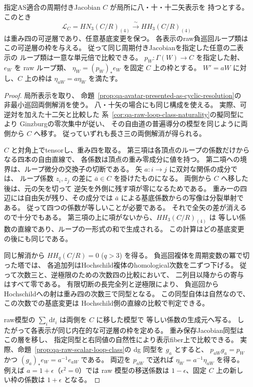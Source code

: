 \begin{proposition}[固定Jacobianの重み四の負巡回直線]
\label{prop:qa-jacobian-weight-four-cy-line}
指定AS適合の周期付きJacobian $C$ が局所に八・十・十二矢表示を
持つとする。このとき
\[
 \mathscr L_C=HN_3(C/R)_{(4)}
       \xrightarrow{\ \sim\ } HH_3(C/R)_{(4)}
\]
は重み四の可逆層であり、任意基底変更を保つ。
各表示のraw負巡回ループ類はこの可逆層の枠を与える。
従って同じ周期付きJacobianを指定した任意の二表示の
ループ類は一意な単元倍で比較できる。
$p_W:\Gamma(W)\to C$ を指定した射、$e_W$ を raw ループ類、
$\eta_W=(p_W)_*e_W$ を固定 $C$ 上の枠とする。
$W'=aW$ に対し、$C$ 上の枠は $\eta_{aW}=a\eta_W$ を満たす。
\end{proposition}
\begin{proof}
局所表示を取り、
命題~\ref{prop:qa-avatar-presented-as-cyclic-resolution}の
非最小巡回両側解消を使う。
八・十矢の場合にも同じ構成を使える。
実際、可逆対を加えた十二矢と比較した
系~\ref{cor:qa-raw-loop-class-naturality}の擬同型により
Ginzburgの零次集中が従い、
その自由道の普遍導分の模型を同じように両側から $C$ へ移す。
従っていずれも長さ三の両側解消が得られる。

$C$ と対角上でtensorし、重み四を取る。
第三項は各頂点のループの係数だけからなる四本の自由直線で、
各係数は頂点の重み零成分に値を持つ。
第二項への境界は、ループ微分の交換子の切断である。
矢 $a:i\to j$ に双対な関係の成分では、
ループ係数 $z_i,z_j$ の差に $\bar a\in C$ を掛けたものになる。
両側から $C$ へ移した後は、元の矢を切って
逆矢を外側に残す項が零になるためである。
重み一の四辺には自由矢が残り、その成分では
$\bar a$ による基底係数からの写像は分裂単射である。
従って四つの係数が等しいことが必要である。
それで全矢の差が消えるので十分でもある。
第三項の上に項がないから、$HH_3(C/R)_{(4)}$ は
等しい係数の直線であり、ループの一形式の和で生成される。
この計算はどの基底変更の後にも同じである。

同じ解消から $HH_q(C/R)=0$ ($q>3$) を得る。
負巡回複体を周期変数の冪で切った塔では、
各追加列はHochschild複体のhomological次数を二ずつ下げる。
従って次数三と、逆極限のための次数四の比較において、
二列目以降からの寄与はすべて零である。
有限切断の長完全列と逆極限により、
負巡回からHochschildへの射は重み四の次数三で同型となる。
この同型自体は自然なので、この次数での基底変更は
Hochschild側の直線の比較で判定できる。

raw模型の $\sum_i\mathrm d t_i$ は両側を $C$ に移した模型で
等しい係数の生成元へ写る。
したがって各表示が同じ内在的な可逆層の枠を定める。
重み保存Jacobian同型はこの層を移し、
指定同型と右同値の自然性により表示fiber上で比較できる。
実際、命題~\ref{prop:qa-raw-scalar-loop-class}の dg 同型を $g_a$ とすると、
$p_{aW}g_a=p_W$ かつ $(g_a)_*e_W=a^{-1}e_{aW}$ である。
両辺を $p_{aW}$ で送れば $\eta_W=a^{-1}\eta_{aW}$ を得る。
例えば $a=1+\epsilon$（$\epsilon^2=0$）では raw 模型の移送係数は
$1-\epsilon$、固定 $C$ 上の新しい枠の係数は $1+\epsilon$ となる。
\end{proof}

